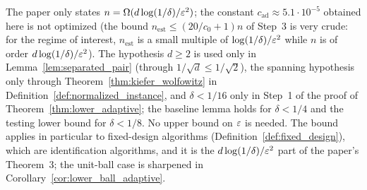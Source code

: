 \begin{remark}\label{rem:lower_adaptive_constant}
The paper only states $n = \Omega(d\log(1/\delta)/\varepsilon^2)$; the constant
$c_{\mathrm{ad}} \approx 5.1\cdot 10^{-5}$ obtained here is not optimized (the bound
$n_{\mathrm{est}} \le (20/c_0 + 1)n$ of Step~3 is very crude: for the regime of interest,
$n_{\mathrm{est}}$ is a small multiple of $\log(1/\delta)/\varepsilon^2$ while $n$ is of order
$d\log(1/\delta)/\varepsilon^2$). The hypothesis $d \ge 2$ is used only in Lemma~\ref{lem:separated_pair}
(through $1/\sqrt d \le 1/\sqrt2$), the spanning hypothesis only through
Theorem~\ref{thm:kiefer_wolfowitz} in Definition~\ref{def:normalized_instance}, and $\delta < 1/16$ only in Step~1 of the proof of
Theorem~\ref{thm:lower_adaptive}; the baseline lemma holds for $\delta < 1/4$ and the testing
lower bound for $\delta < 1/8$. No upper bound on $\varepsilon$ is needed. The bound applies in
particular to fixed-design algorithms (Definition~\ref{def:fixed_design}), which are
identification algorithms, and it is the $d\log(1/\delta)/\varepsilon^2$ part of the paper's
Theorem~3; the unit-ball case is sharpened in Corollary~\ref{cor:lower_ball_adaptive}.
\end{remark}
